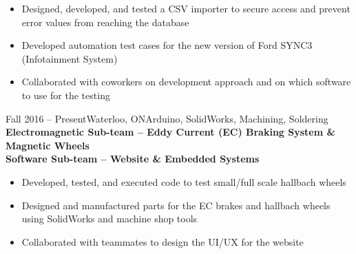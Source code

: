 \documentclass[8pt,a4paper]{altacv}
\begin{document}


\begin{fullwidth}
\makecvheader
\end{fullwidth}


\begin{itemize}
\item Designed, developed, and tested a CSV importer to secure access and prevent error values from reaching the database 
\end{itemize}
\divider

\begin{itemize}
\item Developed automation test cases for the new version of Ford SYNC3 (Infotainment System)
\item Collaborated with coworkers on development approach and on which software to use for the testing
\end{itemize}
\divider

{Fall 2016 -- Present}{Waterloo, ON}{\color{accent}Arduino, SolidWorks, Machining, Soldering} \\
\textbf{Electromagnetic Sub-team -- Eddy Current (EC) Braking System \& Magnetic Wheels}\\
\textbf{Software Sub-team -- Website \& Embedded Systems}
\begin{itemize}
\item Developed, tested, and executed code to test small/full scale hallbach wheels
\item Designed and manufactured parts for the EC brakes and hallbach wheels using SolidWorks and machine shop tools
\item Collaborated with teammates to design the UI/UX for the website
\end{itemize}
\divider
\end{document}
